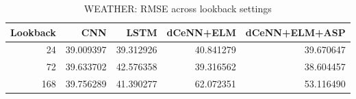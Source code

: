 \begin{table}
\caption{WEATHER: RMSE across lookback settings}
\begin{tabular}{rrrrr}
\toprule
Lookback & CNN & LSTM & dCeNN+ELM & dCeNN+ELM+ASP \\
\midrule
24 & 39.009397 & 39.312926 & 40.841279 & 39.670647 \\
72 & 39.633702 & 42.576358 & 39.316562 & 38.604457 \\
168 & 39.756289 & 41.390277 & 62.072351 & 53.116490 \\
\bottomrule
\end{tabular}
\end{table}

